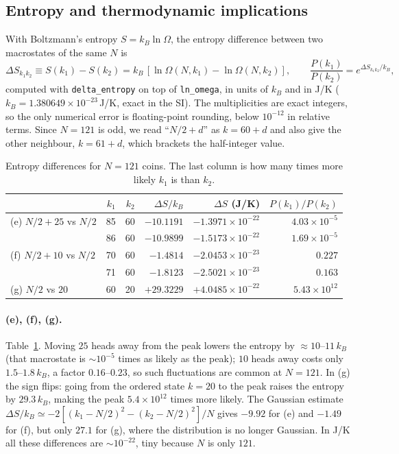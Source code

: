 \subsection{Entropy and thermodynamic implications}
With Boltzmann's entropy $S=k_B\ln\Omega$, the entropy difference between two macrostates of the same $N$ is
\begin{equation}
\Delta S_{k_1k_2}\equiv S(k_1)-S(k_2)=k_B\,[\ln\Omega(N,k_1)-\ln\Omega(N,k_2)],\qquad
\frac{P(k_1)}{P(k_2)}=e^{\Delta S_{k_1k_2}/k_B},
\end{equation}
computed with \texttt{delta\_entropy} on top of \texttt{ln\_omega}, in units of $k_B$ and in J/K ($k_B=1.380649\times10^{-23}$\,J/K, exact in the SI). The multiplicities are exact integers, so the only numerical error is floating-point rounding, below $10^{-12}$ in relative terms. Since $N=121$ is odd, we read ``$N/2+d$'' as $k=60+d$ and also give the other neighbour, $k=61+d$, which brackets the half-integer value.

\begin{table}[htbp]\centering\small
\caption{Entropy differences for $N=121$ coins. The last column is how many times more likely $k_1$ is than $k_2$.}\label{tab:entropy}
\begin{tabular}{@{}lrrrrr@{}}
\toprule
 & $k_1$ & $k_2$ & $\Delta S/k_B$ & $\Delta S$ (J/K) & $P(k_1)/P(k_2)$ \\
\midrule
(e) $N/2+25$ vs $N/2$ & 85 & 60 & $-10.1191$ & $-1.3971\times10^{-22}$ & $4.03\times10^{-5}$ \\
 & 86 & 60 & $-10.9899$ & $-1.5173\times10^{-22}$ & $1.69\times10^{-5}$ \\
(f) $N/2+10$ vs $N/2$ & 70 & 60 & $-1.4814$ & $-2.0453\times10^{-23}$ & $0.227$ \\
 & 71 & 60 & $-1.8123$ & $-2.5021\times10^{-23}$ & $0.163$ \\
(g) $N/2$ vs $20$ & 60 & 20 & $+29.3229$ & $+4.0485\times10^{-22}$ & $5.43\times10^{12}$ \\
\bottomrule
\end{tabular}
\end{table}

\paragraph{(e), (f), (g).} Table~\ref{tab:entropy}. Moving $25$ heads away from the peak lowers the entropy by $\approx10$--$11\,k_B$ (that macrostate is $\sim10^{-5}$ times as likely as the peak); $10$ heads away costs only $1.5$--$1.8\,k_B$, a factor $0.16$--$0.23$, so such fluctuations are common at $N=121$. In (g) the sign flips: going from the ordered state $k=20$ to the peak raises the entropy by $29.3\,k_B$, making the peak $5.4\times10^{12}$ times more likely. The Gaussian estimate $\Delta S/k_B\simeq-2[(k_1-N/2)^2-(k_2-N/2)^2]/N$ gives $-9.92$ for (e) and $-1.49$ for (f), but only $27.1$ for (g), where the distribution is no longer Gaussian. In J/K all these differences are $\sim10^{-22}$, tiny because $N$ is only $121$.


